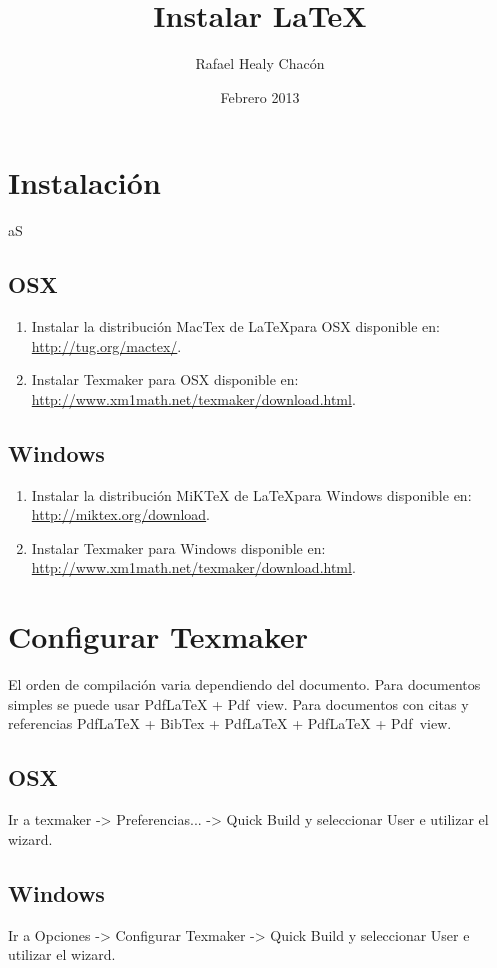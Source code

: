 \documentclass[12pt, a4paper]{article}
\title{Instalar \LaTeX}
\author{Rafael Healy Chacón}
\date{Febrero 2013}
\begin{document}
\maketitle

\section{Instalación}aS
\subsection{OSX}
\begin{enumerate}
\item Instalar la distribución MacTex de \LaTeX para OSX disponible en: \url{http://tug.org/mactex/}.
\item Instalar Texmaker para OSX disponible en: \url{http://www.xm1math.net/texmaker/download.html}.
\end{enumerate}

\subsection{Windows}
\begin{enumerate}
\item Instalar la distribución MiKTeX de \LaTeX para Windows disponible en: \url{http://miktex.org/download}.
\item Instalar Texmaker para Windows disponible en: \url{http://www.xm1math.net/texmaker/download.html}.
\end{enumerate}

\section{Configurar Texmaker}

El orden de compilación varia dependiendo del documento. Para documentos simples se puede usar PdfLaTeX + Pdf~view. Para documentos con citas y referencias PdfLaTeX + BibTex + PdfLaTeX + PdfLaTeX + Pdf~view.

\subsection{OSX}
Ir a texmaker -> Preferencias... -> Quick Build y seleccionar User e utilizar el wizard.

\subsection{Windows}
Ir a Opciones -> Configurar Texmaker -> Quick Build y seleccionar User e utilizar el wizard.
\end{document}
